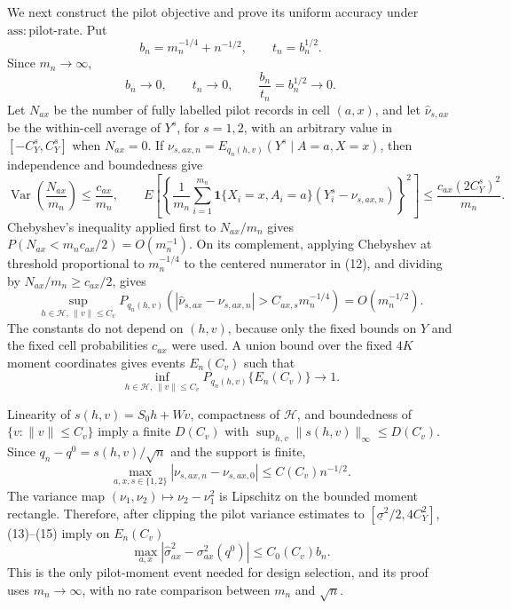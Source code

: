 We next construct the pilot objective and prove its uniform accuracy under \(\mathrm{ass:pilot\text{-}rate}\). Put
\[
b_n=m_n^{-1/4}+n^{-1/2},\qquad t_n=b_n^{1/2}.
\tag{10}
\]
Since \(m_n\to\infty\),
\[
b_n\to0,\qquad t_n\to0,\qquad \frac{b_n}{t_n}=b_n^{1/2}\to0.
\tag{11}
\]
Let \(N_{ax}\) be the number of fully labelled pilot records in cell \((a,x)\), and let \(\widehat\nu_{s,ax}\) be the within-cell average of \(Y^s\), for \(s=1,2\), with an arbitrary value in \([-C_Y^s,C_Y^s]\) when \(N_{ax}=0\). If \(\nu_{s,ax,n}=E_{q_n(h,v)}(Y^s\mid A=a,X=x)\), then independence and boundedness give
\[
\operatorname{Var}\!\left(\frac{N_{ax}}{m_n}\right)\le\frac{c_{ax}}{m_n},
\qquad
E\!\left[\left\{\frac1{m_n}\sum_{i=1}^{m_n}
\mathbf1\{X_i=x,A_i=a\}(Y_i^s-\nu_{s,ax,n})\right\}^2\right]
\le\frac{c_{ax}(2C_Y^s)^2}{m_n}.
\tag{12}
\]
Chebyshev's inequality applied first to \(N_{ax}/m_n\) gives \(P(N_{ax}<m_nc_{ax}/2)=O(m_n^{-1})\). On its complement, applying Chebyshev at threshold proportional to \(m_n^{-1/4}\) to the centered numerator in (12), and dividing by \(N_{ax}/m_n\ge c_{ax}/2\), gives
\[
\sup_{h\in\mathcal H,\,\lVert v\rVert\le C_v}
P_{q_n(h,v)}\!\left(
|\widehat\nu_{s,ax}-\nu_{s,ax,n}|>C_{ax,s}m_n^{-1/4}
\right)=O(m_n^{-1/2}).
\tag{13}
\]
The constants do not depend on \((h,v)\), because only the fixed bounds on \(Y\) and the fixed cell probabilities \(c_{ax}\) were used. A union bound over the fixed \(4K\) moment coordinates gives events \(E_n(C_v)\) such that
\[
\inf_{h\in\mathcal H,\,\lVert v\rVert\le C_v}
P_{q_n(h,v)}\{E_n(C_v)\}\to1.
\tag{14}
\]

Linearity of \(s(h,v)=S_0h+Wv\), compactness of \(\mathcal H\), and boundedness of \(\{v:\lVert v\rVert\le C_v\}\) imply a finite \(D(C_v)\) with \(\sup_{h,v}\lVert s(h,v)\rVert_\infty\le D(C_v)\). Since \(q_n-q^0=s(h,v)/\sqrt n\) and the support is finite,
\[
\max_{a,x,s\in\{1,2\}}|\nu_{s,ax,n}-\nu_{s,ax,0}|
\le C(C_v)n^{-1/2}.
\tag{15}
\]
The variance map \((\nu_1,\nu_2)\mapsto\nu_2-\nu_1^2\) is Lipschitz on the bounded moment rectangle. Therefore, after clipping the pilot variance estimates to \([\underline\sigma^2/2,4C_Y^2]\), (13)--(15) imply on \(E_n(C_v)\)
\[
\max_{a,x}|\widehat\sigma^2_{ax}-\sigma^2_{ax}(q^0)|
\le C_0(C_v)b_n.
\tag{16}
\]
This is the only pilot-moment event needed for design selection, and its proof uses \(m_n\to\infty\), with no rate comparison between \(m_n\) and \(\sqrt n\).

